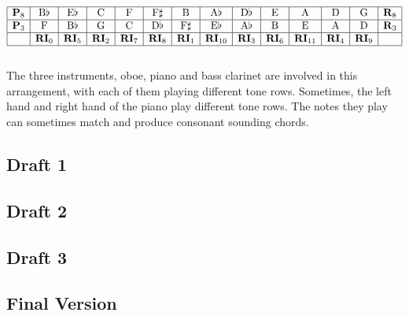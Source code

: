\documentclass{article}
\begin{document}
\[\begin{array}{|c|c|c|c|c|c|c|c|c|c|c|c|c|c|}
\hline
\mathbf{P}_8&\mathrm{B}\flat&\mathrm{E}\flat&\mathrm{C}&\mathrm{F}&\mathrm{F}\sharp&\mathrm{B}&\mathrm{A}\flat&\mathrm{D}\flat&\mathrm{E}&\mathrm{A}&\mathrm{D}&\mathrm{G}&\mathbf{R}_8\\
\hline
\mathbf{P}_3&\mathrm{F}&\mathrm{B}\flat&\mathrm{G}&\mathrm{C}&\mathrm{D}\flat&\mathrm{F}\sharp&\mathrm{E}\flat&\mathrm{A}\flat&\mathrm{B}&\mathrm{E}&\mathrm{A}&\mathrm{D}&\mathbf{R}_3\\
\hline
&\mathbf{RI}_0&\mathbf{RI}_5&\mathbf{RI}_2&\mathbf{RI}_7&\mathbf{RI}_8&\mathbf{RI}_1&\mathbf{RI}_{10}&\mathbf{RI}_3&\mathbf{RI}_6&\mathbf{RI}_{11}&\mathbf{RI}_4&\mathbf{RI}_9&\\
\hline
\end{array}\]\\

The three instruments, oboe, piano and bass clarinet are involved in this
arrangement, with each of them playing different tone rows. Sometimes, the left
hand and right hand of the piano play different tone rows. The notes they play
can sometimes match and produce consonant sounding chords.\\

\newpage
\begin{center}
\vspace*{\fill}
\LARGE
\subsection{Draft 1}
\vspace*{\fill}
%
\end{center}
\newpage
\begin{center}
\vspace*{\fill}
\LARGE
\subsection{Draft 2}
\vspace*{\fill}
%
\end{center}
\newpage
\begin{center}
\vspace*{\fill}
\LARGE
\subsection{Draft 3}
\vspace*{\fill}
%
\end{center}
\newpage
\begin{center}
\vspace*{\fill}
\LARGE
\subsection{Final Version}
\vspace*{\fill}
%
\end{center}

\end{document}
